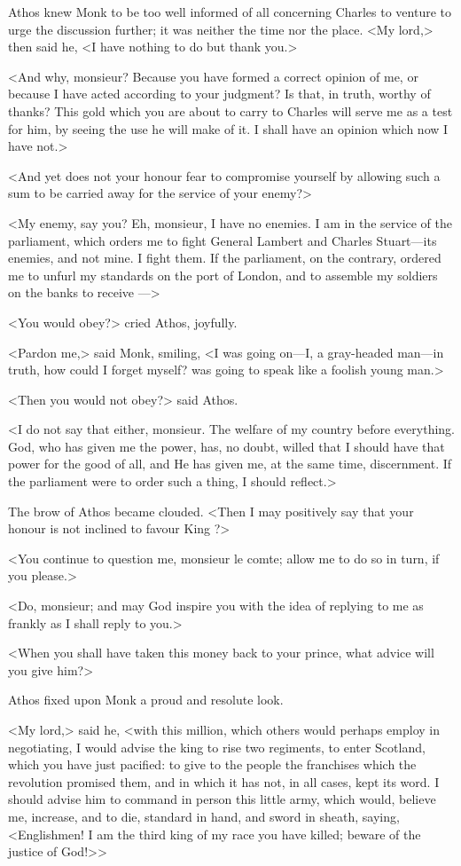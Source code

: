 Athos knew Monk to be too well informed of all concerning Charles to venture to urge the discussion further; it was neither the time nor the place. <My lord,> then said he, <I have nothing to do but thank you.>

<And why, monsieur? Because you have formed a correct opinion of me, or because I have acted according to your judgment? Is that, in truth, worthy of thanks? This gold which you are about to carry to Charles will serve me as a test for him, by seeing the use he will make of it. I shall have an opinion which now I have not.>

<And yet does not your honour fear to compromise yourself by allowing such a sum to be carried away for the service of your enemy?>

<My enemy, say you? Eh, monsieur, I have no enemies. I am in the service of the parliament, which orders me to fight General Lambert and Charles Stuart—its enemies, and not mine. I fight them. If the parliament, on the contrary, ordered me to unfurl my standards on the port of London, and to assemble my soldiers on the banks to receive —>

<You would obey?> cried Athos, joyfully.

<Pardon me,> said Monk, smiling, <I was going on—I, a gray-headed man—in truth, how could I forget myself? was going to speak like a foolish young man.>

<Then you would not obey?> said Athos.

<I do not say that either, monsieur. The welfare of my country before everything. God, who has given me the power, has, no doubt, willed that I should have that power for the good of all, and He has given me, at the same time, discernment. If the parliament were to order such a thing, I should reflect.>

The brow of Athos became clouded. <Then I may positively say that your honour is not inclined to favour King ?>

<You continue to question me, monsieur le comte; allow me to do so in turn, if you please.>

<Do, monsieur; and may God inspire you with the idea of replying to me as frankly as I shall reply to you.>

<When you shall have taken this money back to your prince, what advice will you give him?>

Athos fixed upon Monk a proud and resolute look.

<My lord,> said he, <with this million, which others would perhaps employ in negotiating, I would advise the king to rise two regiments, to enter Scotland, which you have just pacified: to give to the people the franchises which the revolution promised them, and in which it has not, in all cases, kept its word. I should advise him to command in person this little army, which would, believe me, increase, and to die, standard in hand, and sword in sheath, saying, <Englishmen! I am the third king of my race you have killed; beware of the justice of God!>>

